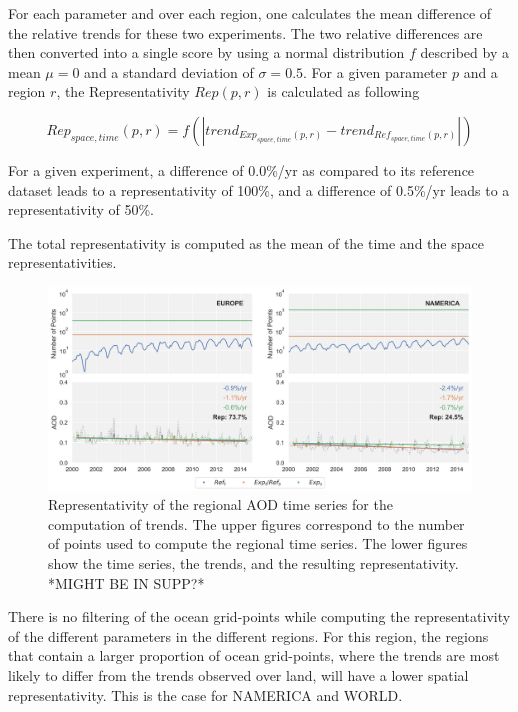 \documentclass[journal abbreviation, manuscript]{copernicus}
\begin{document}
For each parameter and over each region, one calculates the mean difference of the relative trends for these two experiments. The two relative differences are then converted into a single score by using a normal distribution $f$ described by a mean $\mu=0$ and a standard deviation of $\sigma=0.5$. For a given parameter $p$ and a region $r$, the Representativity $Rep(p,r)$ is calculated as following

\begin{equation}
 Rep_{space,time}(p, r) = {f\left(\left| trend_{Exp_{space,time}(p, r)}-trend_{Ref_{space,time}(p, r)} \right|\right)}
\end{equation}

For a given experiment, a difference of 0.0\%/yr as compared to its reference dataset leads to a representativity of 100\%, and a difference of 0.5\%/yr leads to a representativity of 50\%.

The total representativity is computed as the mean of the time and the space representativities.

\begin{figure}[t]
 \includegraphics[width=16cm]{../scripts/figs/representativity.png}
 \caption{Representativity of the regional AOD time series for the computation of trends. The upper figures correspond to the number of points used to compute the regional time series. The lower figures show the time series, the trends, and the resulting representativity. *MIGHT BE IN SUPP?*}
 \label{representativity}
\end{figure}

There is no filtering of the ocean grid-points while computing the representativity of the different parameters in the different regions. For this region, the regions that contain a larger proportion of ocean grid-points, where the trends are most likely to differ from the trends observed over land, will have a lower spatial representativity. This is the case for NAMERICA and WORLD.
\end{document}
